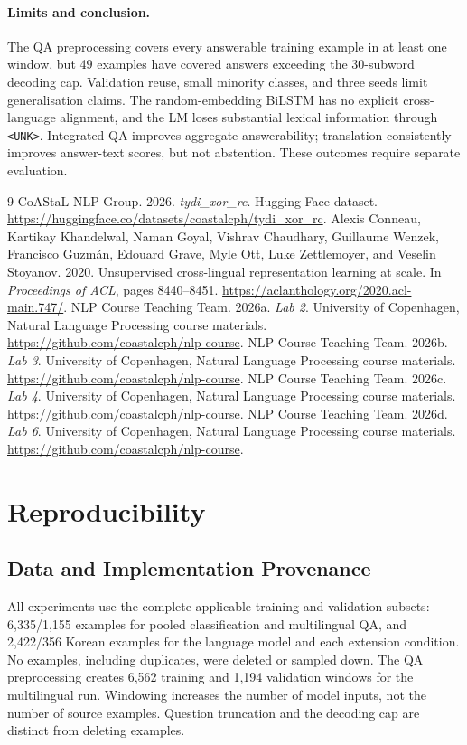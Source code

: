 \documentclass[11pt]{article}
\newcommand{\unk}{\texttt{<UNK>}}
\begin{document}
\paragraph{Limits and conclusion.}
The QA preprocessing covers every answerable training example in at least one window, but 49 examples have covered answers exceeding the 30-subword decoding cap. Validation reuse, small minority classes, and three seeds limit generalisation claims. The random-embedding BiLSTM has no explicit cross-language alignment, and the LM loses substantial lexical information through \unk{}. Integrated QA improves aggregate answerability; translation consistently improves answer-text scores, but not abstention. These outcomes require separate evaluation.

\clearpage
\begin{thebibliography}{9}
CoAStaL NLP Group. 2026. \textit{tydi\_xor\_rc}. Hugging Face dataset. \url{https://huggingface.co/datasets/coastalcph/tydi_xor_rc}.
Alexis Conneau, Kartikay Khandelwal, Naman Goyal, Vishrav Chaudhary, Guillaume Wenzek, Francisco Guzm\'an, Edouard Grave, Myle Ott, Luke Zettlemoyer, and Veselin Stoyanov. 2020. Unsupervised cross-lingual representation learning at scale. In \textit{Proceedings of ACL}, pages 8440--8451. \url{https://aclanthology.org/2020.acl-main.747/}.
NLP Course Teaching Team. 2026a. \textit{Lab 2}. University of Copenhagen, Natural Language Processing course materials. \url{https://github.com/coastalcph/nlp-course}.
NLP Course Teaching Team. 2026b. \textit{Lab 3}. University of Copenhagen, Natural Language Processing course materials. \url{https://github.com/coastalcph/nlp-course}.
NLP Course Teaching Team. 2026c. \textit{Lab 4}. University of Copenhagen, Natural Language Processing course materials. \url{https://github.com/coastalcph/nlp-course}.
NLP Course Teaching Team. 2026d. \textit{Lab 6}. University of Copenhagen, Natural Language Processing course materials. \url{https://github.com/coastalcph/nlp-course}.
\end{thebibliography}

\clearpage
\appendix
\section{Reproducibility}
\subsection{Data and Implementation Provenance}
All experiments use the complete applicable training and validation subsets: 6,335/1,155 examples for pooled classification and multilingual QA, and 2,422/356 Korean examples for the language model and each extension condition. No examples, including duplicates, were deleted or sampled down. The QA preprocessing creates 6,562 training and 1,194 validation windows for the multilingual run. Windowing increases the number of model inputs, not the number of source examples. Question truncation and the decoding cap are distinct from deleting examples.
\end{document}
